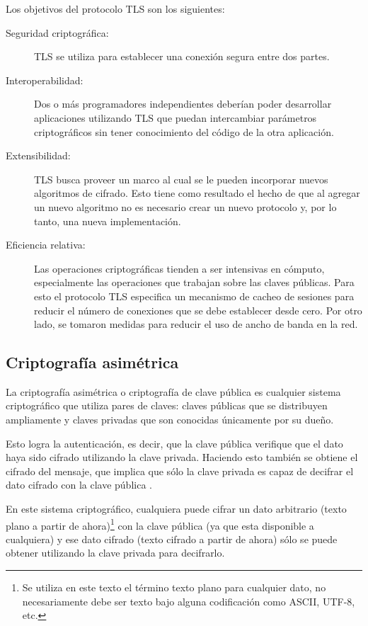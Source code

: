 Los objetivos del protocolo TLS son los siguientes:
\begin{description}
	\item [Seguridad criptográfica:] TLS se utiliza para establecer una conexión segura entre dos partes.
	\item [Interoperabilidad:] Dos o más programadores independientes deberían poder desarrollar aplicaciones utilizando TLS que puedan intercambiar parámetros criptográficos sin tener conocimiento del código de la otra aplicación.
	\item [Extensibilidad:] TLS busca proveer un marco al cual se le pueden incorporar nuevos algoritmos de cifrado. Esto tiene como resultado el hecho de que al agregar un nuevo algoritmo no es necesario crear un nuevo protocolo y, por lo tanto, una nueva implementación.
	\item [Eficiencia relativa:] Las operaciones criptográficas tienden a ser intensivas en cómputo, especialmente las operaciones que trabajan sobre las claves públicas. Para esto el protocolo TLS especifica un mecanismo de cacheo de sesiones para reducir el número de conexiones que se debe establecer desde cero. Por otro lado, se tomaron medidas para reducir el uso de ancho de banda en la red.
\end{description}

\subsection{Criptografía asimétrica}
La criptografía asimétrica o criptografía de clave pública es cualquier sistema criptográfico que utiliza pares de claves: claves públicas que se distribuyen ampliamente y claves privadas que son conocidas únicamente por su dueño. 

Esto logra la autenticación, es decir, que la clave pública verifique que el dato haya sido cifrado utilizando la clave privada. Haciendo esto también se obtiene el cifrado del mensaje, que implica que sólo la clave privada es capaz de decifrar el dato cifrado con la clave pública \cite{crypto}.

En este sistema criptográfico, cualquiera puede cifrar un dato arbitrario (texto plano a partir de ahora)\footnote{Se utiliza en este texto el término texto plano para cualquier dato, no necesariamente debe ser texto bajo alguna codificación como ASCII, UTF-8, etc.} con la clave pública (ya que esta disponible a cualquiera) y ese dato cifrado (texto cifrado a partir de ahora) sólo se puede obtener utilizando la clave privada para decifrarlo.

